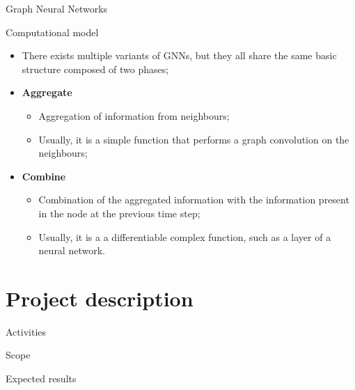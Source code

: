 \documentclass[presentation]{beamer}\mode<presentation>{\usetheme{AMSBolognaFC}}
\begin{document}
\begin{frame}[allowframebreaks]{Graph Neural Networks}
\begin{alertblock}{Computational model}
	\begin{itemize}
		\item There exists multiple variants of GNNs, but they all share the same basic structure composed of two phases;
		\item \textbf{Aggregate}
		\begin{itemize}
			\item Aggregation of information from neighbours;
			\item Usually, it is a simple function that performs a graph convolution on the neighbours;
		\end{itemize}
		\item \textbf{Combine}
		\begin{itemize}
			\item Combination of the aggregated information with the information present in the 
				node at the previous time step;
			\item Usually, it is a a differentiable complex function, such as a layer of a neural network.
		\end{itemize}
	\end{itemize}
\end{alertblock}
	
\end{frame}



\section{Project description}

\begin{frame}[c]{Activities}

	
\end{frame}

\begin{frame}[c]{Scope}

\end{frame}


\begin{frame}[c]{Expected results}

\end{frame}



\end{document}

